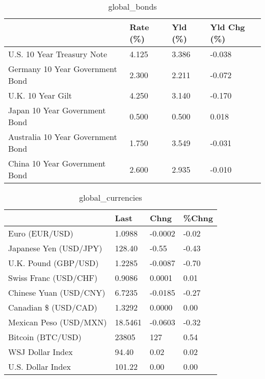 \documentclass{article}%
\begin{document}
%


\begin{table}[htbp]%
\caption{global\_bonds}%
\centering%
\begin{adjustbox}{width=1\textwidth}%
\begin{tabular}{llll}
\toprule
                                  & Rate (\%) & Yld (\%) & Yld Chg (\%) \\
\midrule
       U.S. 10 Year Treasury Note &    4.125 &   3.386 &      -0.038 \\
  Germany 10 Year Government Bond &    2.300 &   2.211 &      -0.072 \\
                U.K. 10 Year Gilt &    4.250 &   3.140 &      -0.170 \\
    Japan 10 Year Government Bond &    0.500 &   0.500 &       0.018 \\
Australia 10 Year Government Bond &    1.750 &   3.549 &      -0.031 \\
    China 10 Year Government Bond &    2.600 &   2.935 &      -0.010 \\
\bottomrule
\end{tabular}
%
\end{adjustbox}%
\end{table}

%


\begin{table}[htbp]%
\caption{global\_currencies}%
\centering%
\begin{adjustbox}{width=1\textwidth}%
\begin{tabular}{llll}
\toprule
                       &    Last &    Chng & \%Chng \\
\midrule
        Euro (EUR/USD) &  1.0988 & -0.0002 & -0.02 \\
Japanese Yen (USD/JPY) &  128.40 &   -0.55 & -0.43 \\
  U.K. Pound (GBP/USD) &  1.2285 & -0.0087 & -0.70 \\
 Swiss Franc (USD/CHF) &  0.9086 &  0.0001 &  0.01 \\
Chinese Yuan (USD/CNY) &  6.7235 & -0.0185 & -0.27 \\
  Canadian \$ (USD/CAD) &  1.3292 &  0.0000 &  0.00 \\
Mexican Peso (USD/MXN) & 18.5461 & -0.0603 & -0.32 \\
     Bitcoin (BTC/USD) &   23805 &     127 &  0.54 \\
      WSJ Dollar Index &   94.40 &    0.02 &  0.02 \\
     U.S. Dollar Index &  101.22 &    0.00 &  0.00 \\
\bottomrule
\end{tabular}
%
\end{adjustbox}%
\end{table}
\end{document}
